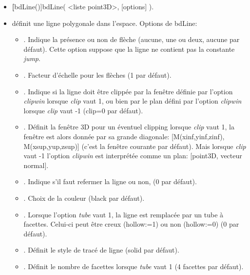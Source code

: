 \begin{itemize}
 \item \util \textbf[bdLine()]{bdLine( <liste point3D>, [options] )}.
 \item \desc définit une ligne polygonale dans l'espace. Options de bdLine:

  \begin{itemize}
   \item {}. Indique la présence ou non de flèche (aucune, une ou deux, aucune par défaut). Cette option suppose que la ligne ne contient pas la constante \textit{jump}.

   \item {}. Facteur d'échelle pour les flèches (1 par défaut).

   \item {}. Indique si la ligne doit être clippée par la fenêtre définie par l'option \textit{clipwin} lorsque \textit{clip} vaut 1, ou bien par le plan défini par l'option \textit{clipwin} lorsque \textit{clip} vaut -1 (clip=0 par défaut).

   \item {}. Définit la fenêtre 3D pour un éventuel clipping lorsque \textit{clip} vaut 1, la fenêtre est alors donnée par sa grande diagonale: [M(xinf,yinf,zinf), M(xsup,yup,zsup)] (c'est la fenêtre courante par défaut). Mais lorsque \textit{clip} vaut -1 l'option \textit{clipwin} est interprétée comme un plan: [point3D, vecteur normal].

   \item {}. Indique s'il faut refermer la ligne ou non, (0 par défaut). 

   \item {}. Choix de la couleur (black par défaut).

   \item {}. Lorsque l'option \textit{tube} vaut 1, la ligne est remplacée par un tube à facettes. Celui-ci peut être creux (hollow:=1) ou non (hollow:=0) (0 par défaut).

   \item {}. Définit le style de tracé de ligne (solid par défaut).

   \item {}. Définit le nombre de facettes lorsque \textit{tube} vaut 1 (4 facettes par défaut).


\end{itemize}
\end{itemize}
